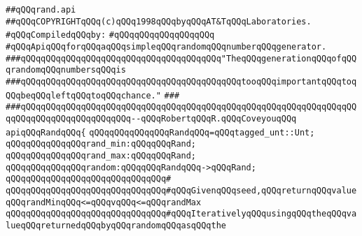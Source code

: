 \label{src/lib/src/rand.api}
\verb|##qQQqrand.api|\newline
\verb|##qQQqCOPYRIGHTqQQq(c)qQQq1998qQQqbyqQQqAT&TqQQqLaboratories.|\newline
\newline
\verb|#qQQqCompiledqQQqby:|\newline
\verb|#qQQqqQQqqQQqqQQqqQQq|\newline
\newline
\newline
\newline
\verb|#qQQqApiqQQqforqQQqaqQQqsimpleqQQqrandomqQQqnumberqQQqgenerator.|\newline
\newline
\newline
\newline
\verb|###qQQqqQQqqQQqqQQqqQQqqQQqqQQqqQQqqQQqqQQq"TheqQQqgenerationqQQqofqQQqrandomqQQqnumbersqQQqis|\newline
\verb|###qQQqqQQqqQQqqQQqqQQqqQQqqQQqqQQqqQQqqQQqqQQqtooqQQqimportantqQQqtoqQQqbeqQQqleftqQQqtoqQQqchance."|\newline
\verb|###|\newline
\verb|###qQQqqQQqqQQqqQQqqQQqqQQqqQQqqQQqqQQqqQQqqQQqqQQqqQQqqQQqqQQqqQQqqQQqqQQqqQQqqQQqqQQqqQQqqQQq--qQQqRobertqQQqR.qQQqCoveyouqQQq|\newline
\newline
\newline
\newline
\verb|apiqQQqRandqQQq{|\newline
\newline
\verb|qQQqqQQqqQQqqQQqRandqQQq=qQQqtagged_unt::Unt;|\newline
\newline
\verb|qQQqqQQqqQQqqQQqrand_min:qQQqqQQqRand;|\newline
\verb|qQQqqQQqqQQqqQQqrand_max:qQQqqQQqRand;|\newline
\newline
\verb|qQQqqQQqqQQqqQQqrandom:qQQqqQQqRandqQQq->qQQqRand;|\newline
\verb|qQQqqQQqqQQqqQQqqQQqqQQqqQQqqQQq#|\newline
\verb|qQQqqQQqqQQqqQQqqQQqqQQqqQQqqQQq#qQQqGivenqQQqseed,qQQqreturnqQQqvalueqQQqrandMinqQQq<=qQQqvqQQq<=qQQqrandMax|\newline
\verb|qQQqqQQqqQQqqQQqqQQqqQQqqQQqqQQq#qQQqIterativelyqQQqusingqQQqtheqQQqvalueqQQqreturnedqQQqbyqQQqrandomqQQqasqQQqthe|\newline
